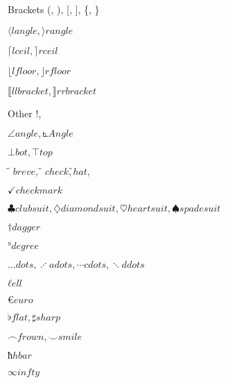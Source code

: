 \documentclass{article}
\begin{document}
Brackets (, ), [, ], \{, \}

$⟨ langle, ⟩ rangle$

$⌈ lceil, ⌉ rceil$

$⌊ lfloor, ⌋ rfloor$

$⟦ llbracket, ⟧ rrbracket$

Other !, %

$∠ angle, ⦜ Angle$

$⊥ bot, ⊤ top$

$̆ breve, ̌ check, ̂ hat,$ %

$✓ checkmark$

$♣ clubsuit, ♢ diamondsuit, ♡ heartsuit, ♠ spadesuit$

$† dagger$

$° degree$

$… dots, ⋰ adots, ⋯ cdots, ⋱ ddots$

$ℓ ell$

$€ euro$

$♭ flat, ♯ sharp$

$⌢ frown, ⌣ smile$

$ħ hbar$

$∞ infty$
\end{document}

